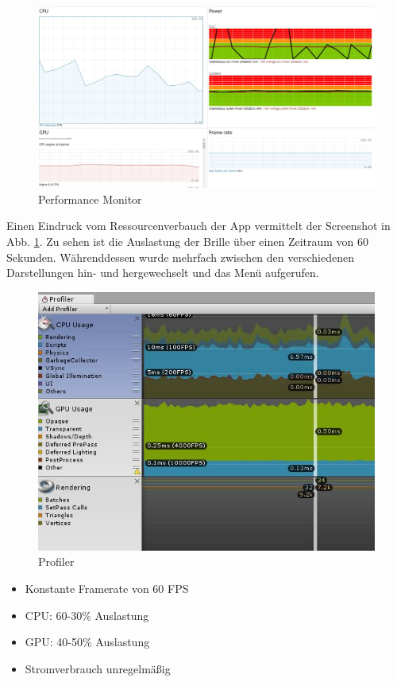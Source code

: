 \begin{figure}[h!]
	\centering
	\includegraphics[width=\textwidth]{images/performance/performance.jpg}
	\caption{Performance Monitor}
	\label{img:performance}
\end{figure}

Einen Eindruck vom Ressourcenverbauch der App vermittelt der Screenshot in Abb. \ref{img:performance}. Zu sehen ist die Auslastung der Brille über einen Zeitraum von 60 Sekunden. Währenddessen wurde mehrfach zwischen den verschiedenen Darstellungen hin- und hergewechselt und das Menü aufgerufen.

\begin{figure}[h!]
	\centering
	\includegraphics[width=\textwidth]{images/performance/profiler.png}
	\caption{Profiler}
	\label{img:profiler}
\end{figure}

\begin{itemize}
	\setlength{\itemsep}{-1pt}
	\singlespacing
	\item Konstante Framerate von 60 FPS
	\item CPU: 60-30\% Auslastung
	\item GPU: 40-50\% Auslastung
	\item Stromverbrauch unregelmäßig
\end{itemize}

